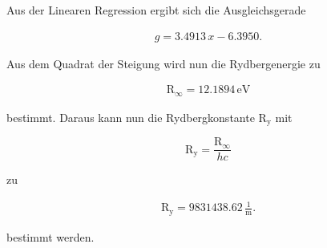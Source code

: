 \newpage
\noindent
Aus der Linearen Regression ergibt sich die Ausgleichsgerade

\begin{align*}
    g=3.4913\, x -6.3950.
\end{align*}

\noindent
Aus dem Quadrat der Steigung wird nun die Rydbergenergie zu 

\begin{align*}
    \text{R}_\infty =12.1894 \, \mathrm{eV}
\end{align*}

\noindent
bestimmt.
Daraus kann nun die Rydbergkonstante $\text{R}_\text{y}$ mit

\begin{equation*}
 \text{R}_\text{y}=\frac{\text{R}_\infty}{hc}
\end{equation*}

\noindent
zu 

\begin{align*}
\text{R}_\text{y} =9831438.62 \, \frac{1}{\text{m}}.
\end{align*}

\noindent
bestimmt werden.